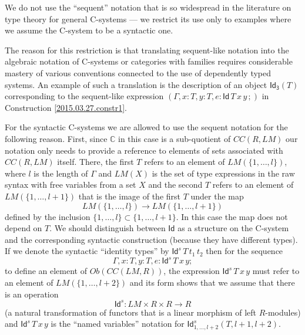 \documentclass[12pt]{article}
\numberwithin{equation}{section}
\newcommand{\sr}{\rightarrow}
\newcommand{\toCC}{CC} %
\newcommand{\CC}{{\mathbb C}}  %
\newcommand{\p}{\mathsf{p}}
\newcommand{\Id}{\mathsf{Id}} %
\newcommand{\Idx}{\mathsf{Id_3}} %
\begin{document}
We do not use the ``sequent'' notation that is so widespread in the literature
on type theory for general C-systems --- we restrict its use only to examples where
we assume the C-system to be a syntactic one.

The reason for this restriction is that translating sequent-like notation
into the algebraic notation of C-systems or categories with families requires
considerable mastery of various conventions connected to the use of dependently
typed systems. An example of such a translation is the description of an object
$\Idx(T)$ corresponding to the sequent-like expression
$(\Gamma, x:T, y:T, e:\Id\, T\, x\, y\,;)$ in Construction \ref{2015.03.27.constr1}.


For the syntactic C-systems we are allowed to use the sequent notation for the
following reason. First, since $\CC$ in this case is a sub-quotient of
$\toCC(R,LM)$ our notation only needs to provide a reference to elements of sets
associated with $\toCC(R,LM)$ itself.  There, the first $T$ refers to an element
of $LM(\{1,\dots,l\})$, where $l$ is the length of $\Gamma$ and $LM(X)$ is the
set of type expressions in the raw syntax with free variables from a set $X$
and the second $T$ refers to an element of $LM(\{1,\dots,l+1\})$ that is the
image of the first $T$ under the map
%
$$LM(\{1,\dots,l\})\sr LM(\{1,\dots,l+1\})$$
%
defined by the inclusion $\{1,\dots,l\}\subset \{1,\dots,l+1\}$. In this case
the map does not depend on $T$. We should distinguish between $\Id$ as a
structure on the C-system and the corresponding syntactic construction (because
they have different types). If we denote the syntactic ``identity types'' by
$\Id^s\, T\, t_1\, t_2$ then for the sequence
%
$$\Gamma, x:T, y:T, e:\Id^s\,T\,x\,y;$$
%
to define an element of $Ob(\toCC(LM,R))$, the expression $\Id^s\,T\,x\,y$ must
refer to an element of $LM(\{1,\dots,l+2\})$ and its form shows that we assume
that there is an operation
%
$$\Id^s:LM\times R\times R\sr R$$
%
(a natural transformation of functors that is a linear morphism of left
$R$-modules) and $\Id^s\,T\,x\,y$ is the ``named variables'' notation for
$\Id^s_{{1,\dots,l+2}}(T,l+1,l+2)$.
\end{document}
